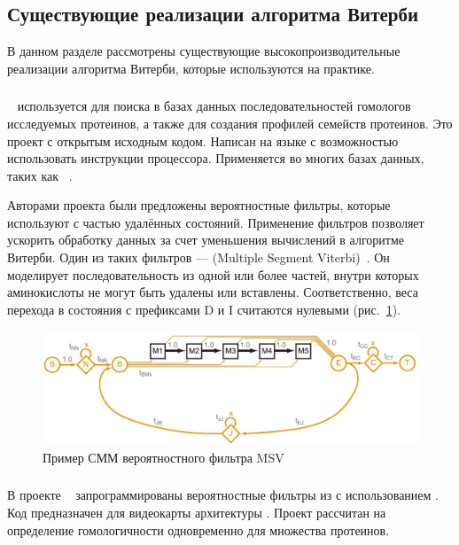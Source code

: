 \subsection{Существующие реализации алгоритма Витерби}
В данном разделе рассмотрены существующие высокопроизводительные реализации алгоритма Витерби, которые используются на практике.

\subsubsection{}
~\cite{HMMer} используется для поиска в базах данных 
последовательностей гомологов исследуемых протеинов, а также для создания 
профилей семейств протеинов.
Это проект с открытым исходным кодом.
Написан на языке  с возможностью использовать  инструкции 
процессора.
Применяется во многих базах данных, таких как ~\cite{Pfam}.

Авторами проекта были предложены вероятностные фильтры, которые используют 
 с частью удалённых состояний.
Применение фильтров позволяет ускорить обработку данных за счет уменьшения
вычислений в алгоритме Витерби.
Один из таких фильтров ---  (Multiple Segment 
Viterbi)~\cite{MSV_Eddy}.
Он моделирует последовательность из одной или более частей, 
внутри которых аминокислоты не могут быть удалены или 
вставлены.
Соответственно, веса перехода в состояния с префиксами D и I 
считаются нулевыми (рис.~\ref{MSV_example}).
\begin{figure}[t]
  \centering
  \includegraphics[width=\columnwidth]{MSV.png}
  \caption{Пример СММ вероятностного фильтра MSV~\cite{MSV_Eddy}}
  \label{MSV_example}
\end{figure}

\subsubsection{}
В проекте ~\cite{cudampf} запрограммированы вероятностные фильтры из 
 с использованием .
Код предназначен для видеокарты   архитектуры
.
Проект рассчитан на определение гомологичности одновременно для множества 
протеинов.

